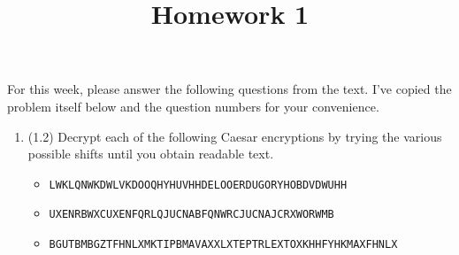 \documentclass[12pt]{amsart}
\theoremstyle{definition}
\begin{document}
\title{Homework 1}

\maketitle

For this week, please answer the following questions from the text. 
I've copied the problem itself below and the question numbers for 
your convenience. 

\begin{enumerate}
	\item (1.2) Decrypt each of the following Caesar encryptions by trying the various 
		possible shifts until you obtain readable text.
		\begin{itemize}
			\item \texttt{LWKLQNWKDWLVKDOOQHYHUVHHDELOOERDUGORYHOBDVDWUHH}
			\item \texttt{UXENRBWXCUXENFQRLQJUCNABFQNWRCJUCNAJCRXWORWMB}
			\item \texttt{BGUTBMBGZTFHNLXMKTIPBMAVAXXLXTEPTRLEXTOXKHHFYHKMAXFHNLX}
		\end{itemize}


\end{enumerate}
\end{document}
